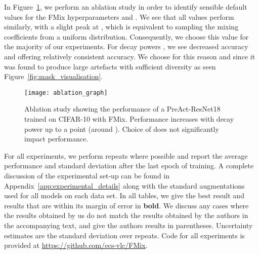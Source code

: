 \documentclass[journal]{IEEEtran}
\newcommand{\fmix}{FMix\xspace}
\newcommand{\cifar}[1]{CIFAR-{#1}\xspace}
\begin{document}
In Figure~\ref{fig:ablation}, we perform an ablation study in order to identify sensible default values for the \fmix hyperparameters  and . We see that all  values perform similarly, with a slight peak at , which is equivalent to sampling the mixing coefficients from a uniform distribution. Consequently, we choose this value for the majority of our experiments. For decay powers , we see decreased accuracy and  offering relatively consistent accuracy. We choose  for this reason and since it was found to produce large artefacts with sufficient diversity as seen Figure~\ref{fig:mask_visualisation}.   




\begin{figure}
    \centering
    \texttt{[image: ablation\_graph]}
    \caption{Ablation study showing the performance of a PreAct-ResNet18 trained on \cifar{10} with \fmix{}. Performance increases with decay power up to a point (around ). Choice of  does not significantly impact performance.}
    \label{fig:ablation}
\end{figure}


For all experiments, we perform repeats where possible and report the average performance and standard deviation after the last epoch of training. A complete discussion of the experimental set-up can be found in Appendix~\ref{app:experimental_details} along with the standard augmentations used for all models on each data set.
In all tables, we give the best result and results that are within its margin of error in \textbf{bold}. We discuss any cases where the results obtained by us do not match the results obtained by the authors in the accompanying text, and give the authors results in parentheses. Uncertainty estimates are the standard deviation over  repeats. Code for all experiments is provided at \url{https://github.com/ecs-vlc/FMix}.
\end{document}

